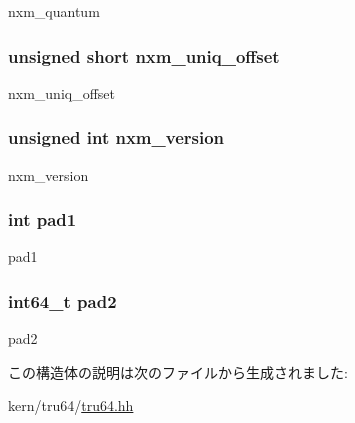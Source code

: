 nxm\_\-quantum \hypertarget{structTru64_1_1nxm__task__attr_a3b5f76b3e0f76058019240a3c5dcaec1}{
\subsubsection[{nxm\_\-uniq\_\-offset}]{\setlength{\rightskip}{0pt plus 5cm}unsigned short {\bf nxm\_\-uniq\_\-offset}}}
\label{structTru64_1_1nxm__task__attr_a3b5f76b3e0f76058019240a3c5dcaec1}


nxm\_\-uniq\_\-offset \hypertarget{structTru64_1_1nxm__task__attr_a70d8998193fec354ad484f497c870676}{
\subsubsection[{nxm\_\-version}]{\setlength{\rightskip}{0pt plus 5cm}unsigned int {\bf nxm\_\-version}}}
\label{structTru64_1_1nxm__task__attr_a70d8998193fec354ad484f497c870676}


nxm\_\-version \hypertarget{structTru64_1_1nxm__task__attr_a6c4eee056561c43fe94348a659fb09c4}{
\subsubsection[{pad1}]{\setlength{\rightskip}{0pt plus 5cm}int {\bf pad1}}}
\label{structTru64_1_1nxm__task__attr_a6c4eee056561c43fe94348a659fb09c4}


pad1 \hypertarget{structTru64_1_1nxm__task__attr_aba56448df1792d4590740cf5a8784799}{
\subsubsection[{pad2}]{\setlength{\rightskip}{0pt plus 5cm}int64\_\-t {\bf pad2}}}
\label{structTru64_1_1nxm__task__attr_aba56448df1792d4590740cf5a8784799}


pad2 

この構造体の説明は次のファイルから生成されました:\begin{DoxyCompactItemize}
\item 
kern/tru64/\hyperlink{kern_2tru64_2tru64_8hh}{tru64.hh}\end{DoxyCompactItemize}
